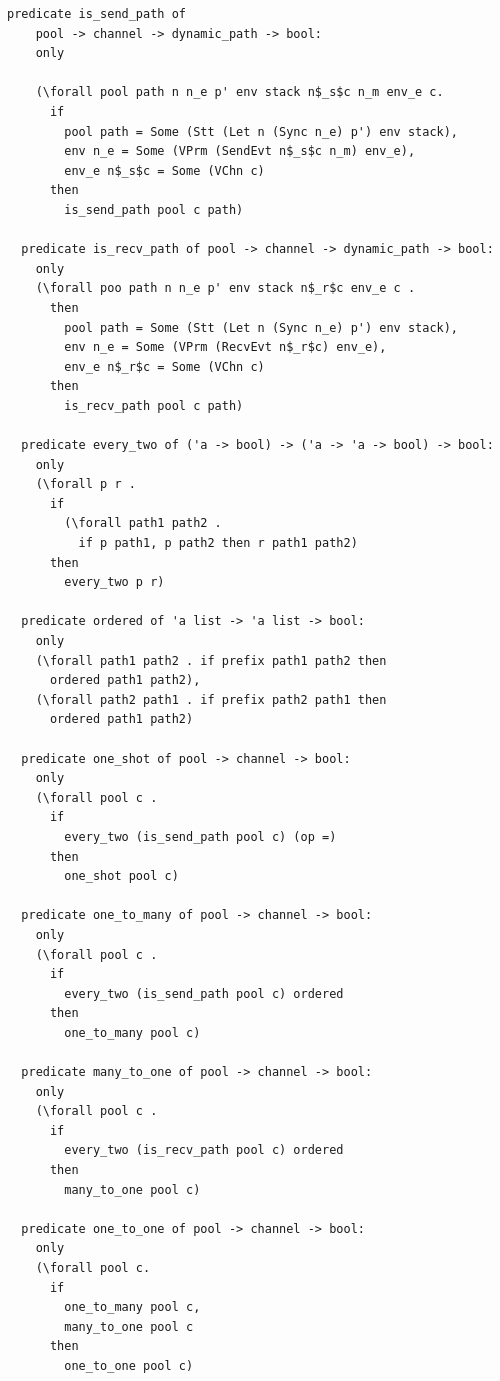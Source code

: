 \documentclass{article}
\begin{document}
\begin{lstlisting}[language=logic, mathescape]
  predicate is_send_path of
    pool -> channel -> dynamic_path -> bool:
    only

    (\forall pool path n n_e p' env stack n$_s$c n_m env_e c.
      if
        pool path = Some (Stt (Let n (Sync n_e) p') env stack),
        env n_e = Some (VPrm (SendEvt n$_s$c n_m) env_e), 
        env_e n$_s$c = Some (VChn c)
      then
        is_send_path pool c path)

  predicate is_recv_path of pool -> channel -> dynamic_path -> bool:
    only
    (\forall poo path n n_e p' env stack n$_r$c env_e c .
      then
        pool path = Some (Stt (Let n (Sync n_e) p') env stack),
        env n_e = Some (VPrm (RecvEvt n$_r$c) env_e),
        env_e n$_r$c = Some (VChn c)
      then
        is_recv_path pool c path)

  predicate every_two of ('a -> bool) -> ('a -> 'a -> bool) -> bool:
    only
    (\forall p r .
      if
        (\forall path1 path2 .
          if p path1, p path2 then r path1 path2)
      then
        every_two p r)

  predicate ordered of 'a list -> 'a list -> bool:
    only
    (\forall path1 path2 . if prefix path1 path2 then
      ordered path1 path2),
    (\forall path2 path1 . if prefix path2 path1 then
      ordered path1 path2)

  predicate one_shot of pool -> channel -> bool:
    only
    (\forall pool c .
      if
        every_two (is_send_path pool c) (op =)
      then
        one_shot pool c)

  predicate one_to_many of pool -> channel -> bool:
    only
    (\forall pool c .
      if
        every_two (is_send_path pool c) ordered
      then
        one_to_many pool c)

  predicate many_to_one of pool -> channel -> bool:
    only
    (\forall pool c .
      if
        every_two (is_recv_path pool c) ordered
      then
        many_to_one pool c)

  predicate one_to_one of pool -> channel -> bool:
    only
    (\forall pool c.
      if
        one_to_many pool c,
        many_to_one pool c
      then
        one_to_one pool c)
  \end{lstlisting}
\end{document}
